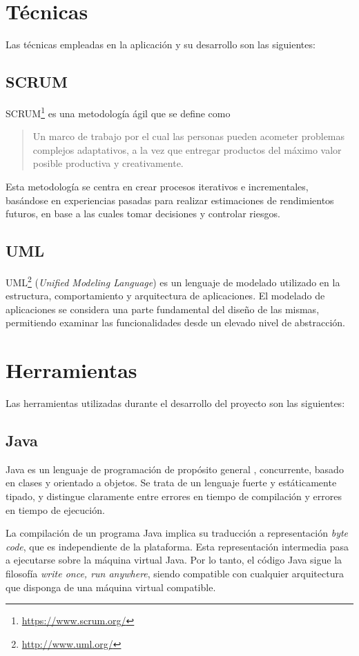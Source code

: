 
\section{Técnicas}
Las técnicas empleadas en la aplicación y su desarrollo son las siguientes:

\subsection{SCRUM}
SCRUM\footnote{\url{https://www.scrum.org/}} es una metodología ágil que se define como\cite{scrum}
\begin{quote}
Un marco de trabajo por el cual las personas pueden acometer problemas complejos 
adaptativos, a la vez que entregar productos del máximo valor posible productiva y 
creativamente.
\end{quote}
Esta metodología se centra en crear procesos iterativos e incrementales, basándose en experiencias pasadas para realizar estimaciones de rendimientos futuros, en base a las cuales tomar decisiones y controlar riesgos.

\subsection{UML}
UML\footnote{\url{http://www.uml.org/}} (\emph{Unified Modeling Language}) es un lenguaje de modelado utilizado en la estructura, comportamiento y arquitectura de aplicaciones.
El modelado de aplicaciones se considera una parte fundamental del diseño de las mismas, permitiendo examinar las funcionalidades desde un elevado nivel de abstracción.

\section{Herramientas}
Las herramientas utilizadas durante el desarrollo del proyecto son las siguientes:

\subsection{Java}
Java es un lenguaje de programación de propósito general \cite{jls8}, concurrente, basado en clases y orientado a objetos.
Se trata de un lenguaje fuerte y estáticamente tipado, y distingue claramente entre errores en tiempo de compilación y errores en tiempo de ejecución.

La compilación de un programa Java implica su traducción a representación \emph{byte code}, que es independiente de la plataforma.
Esta representación intermedia pasa a ejecutarse sobre la máquina virtual Java.
Por lo tanto, el código Java sigue la filosofía \emph{write once, run anywhere}, siendo compatible con cualquier arquitectura que disponga de una máquina virtual compatible.

